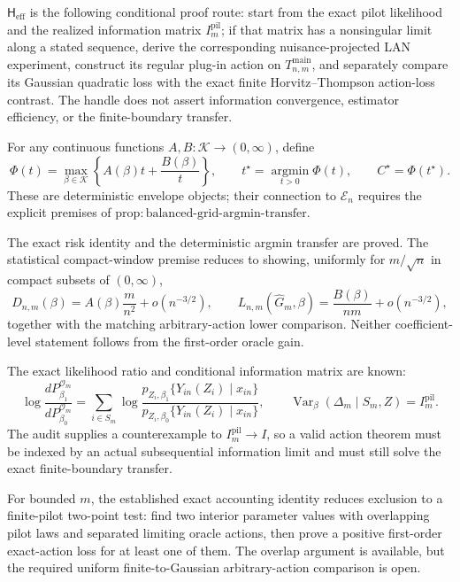 \(\mathsf H_{\mathrm{eff}}\) is the following conditional proof route: start from the exact pilot likelihood and the realized information matrix \(I_m^{\mathrm{pil}}\); if that matrix has a nonsingular limit along a stated sequence, derive the corresponding nuisance-projected LAN experiment, construct its regular plug-in action on \(T_{n,m}^{\mathrm{main}}\), and separately compare its Gaussian quadratic loss with the exact finite Horvitz--Thompson action-loss contrast.  The handle does not assert information convergence, estimator efficiency, or the finite-boundary transfer.

For any continuous functions \(A,B:\mathcal K\to(0,\infty)\), define
\[
\Phi(t)=\max_{\beta\in\mathcal K}
\left\{A(\beta)t+\frac{B(\beta)}{t}\right\},
\qquad
t^\star=\operatorname*{argmin}_{t>0}\Phi(t),
\qquad
C^\star=\Phi(t^\star).
\]
These are deterministic envelope objects; their connection to \(\mathcal E_n\) requires the explicit premises of \(\mathrm{prop{:}balanced\text{-}grid\text{-}argmin\text{-}transfer}\).

The exact risk identity and the deterministic argmin transfer are proved.  The statistical compact-window premise reduces to showing, uniformly for \(m/\sqrt n\) in compact subsets of \((0,\infty)\),
\[
D_{n,m}(\beta)
=A(\beta)\frac m{n^2}
+o(n^{-3/2}),
\qquad
L_{n,m}(\widehat G_m,\beta)
=\frac{B(\beta)}{nm}
+o(n^{-3/2}),
\]
together with the matching arbitrary-action lower comparison.  Neither coefficient-level statement follows from the first-order oracle gain.

The exact likelihood ratio and conditional information matrix are known:
\[
\log\frac{dP_{\beta_1}^{\mathcal O_m}}
{dP_{\beta_0}^{\mathcal O_m}}
=\sum_{i\in S_m}
\log\frac{p_{Z_i,\beta_1}\{Y_{in}(Z_i)\mid x_{in}\}}
{p_{Z_i,\beta_0}\{Y_{in}(Z_i)\mid x_{in}\}},
\qquad
\operatorname{Var}_\beta(\Delta_m\mid S_m,Z)=I_m^{\mathrm{pil}}.
\]
The audit supplies a counterexample to \(I_m^{\mathrm{pil}}\to I\), so a valid action theorem must be indexed by an actual subsequential information limit and must still solve the exact finite-boundary transfer.

For bounded \(m\), the established exact accounting identity reduces exclusion to a finite-pilot two-point test: find two interior parameter values with overlapping pilot laws and separated limiting oracle actions, then prove a positive first-order exact-action loss for at least one of them.  The overlap argument is available, but the required uniform finite-to-Gaussian arbitrary-action comparison is open.

